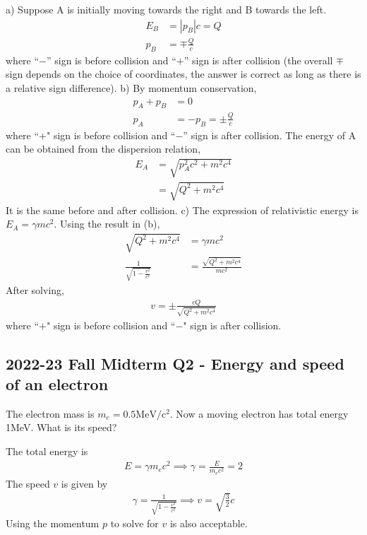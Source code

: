 \documentclass[12pt]{book} %
\numberwithin{equation}{chapter}
\def\c{\gamma}
\begin{document}
\begin{solbox}
a) Suppose A is initially moving towards the right and B towards the left. 
\begin{align*}
E_{B}&=\left|p_{B}\right|c=Q\\
p_{B}&=\mp \frac{Q}{c}
\end{align*}
where ``$-$'' sign is before collision and ``$+$'' sign is after collision (the overall $\mp$ sign depends on the choice of coordinates, the answer is correct as long as there is a relative sign difference).\bigskip\newline
b) By momentum conservation,
\begin{align*}
p_{A}+p_{B}&=0\\
p_{A}&=-p_{B}=\pm\frac{Q}{c}
\end{align*}
where ``$+$" sign is before collision and ``$-$'' sign is after collision.\bigskip\newline
The energy of A can be obtained from the dispersion relation,
\begin{align*}
E_{A}&=\sqrt{p_{A}^{2}c^{2}+m^2 c^4}\\
&=\sqrt{Q^2+m^2 c^4}
\end{align*}
It is the same before and after collision.\bigskip\newline
c) The expression of relativistic energy is $E_{A}=\c mc^2$. Using the result in (b),
\begin{align*}
\sqrt{Q^2+m^2 c^4}&=\c mc^2\\
\frac{1}{\sqrt{1-\frac{v^2}{c^2}}}&=\frac{\sqrt{Q^2+m^2 c^4}}{mc^2}
\end{align*}
After solving,
\begin{align*}
v=\pm\frac{cQ}{\sqrt{Q^2+m^2 c^4}}
\end{align*}
where ``$+$" sign is before collision and ``$-$" sign is after collision.
\end{solbox}

\subsection*{2022-23 Fall Midterm Q2 - Energy and speed of an electron}
The electron mass is $m_{e}=0.5\text{MeV/}\text{c}^{2}$. Now a moving electron has total energy 1MeV. What is its speed?
\begin{solbox}
The total energy is
\begin{align*}
    E=\c m_{e}c^2\implies \c=\frac{E}{m_{e}c^2}=2
\end{align*}
The speed $v$ is given by
\begin{align*}
\c=\frac{1}{\sqrt{1-\frac{v^2}{c^2}}}\implies v=\sqrt{\frac{3}{2}}c
\end{align*}
Using the momentum $p$ to solve for $v$ is also acceptable.
\end{solbox}
\end{document}
